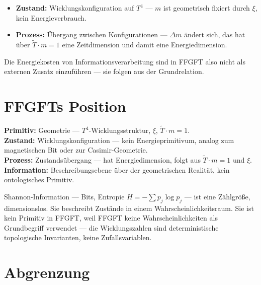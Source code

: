 \begin{itemize}
  \item \textbf{Zustand:} Wicklungskonfiguration auf $T^4$ — $m$ ist
        geometrisch fixiert durch $\xi$, kein Energieverbrauch.
  \item \textbf{Prozess:} Übergang zwischen Konfigurationen — $\Delta m$
        ändert sich, das hat über $\tilde{T} \cdot m = 1$ eine
        Zeitdimension und damit eine Energiedimension.
\end{itemize}

Die Energiekosten von Informationsverarbeitung sind in FFGFT also nicht
als externen Zusatz einzuführen — sie folgen aus der Grundrelation.

\section{FFGFTs Position}

\begin{keyresult}
\textbf{Primitiv:} Geometrie — $T^4$-Wicklungsstruktur, $\xi$, $\tilde{T}\cdot m=1$.\\
\textbf{Zustand:} Wicklungskonfiguration — kein Energieprimitivum, analog
zum magnetischen Bit oder zur Casimir-Geometrie.\\
\textbf{Prozess:} Zustandsübergang — hat Energiedimension, folgt aus
$\tilde{T}\cdot m=1$ und $\xi$.\\
\textbf{Information:} Beschreibungsebene über der geometrischen Realität,
kein ontologisches Primitiv.
\end{keyresult}

Shannon-Information \cite{Shannon1948} — Bits, Entropie $H = -\sum p_j \log p_j$
— ist eine Zählgröße, dimensionslos. Sie beschreibt Zustände in einem
Wahrscheinlichkeitsraum. Sie ist kein Primitiv in FFGFT, weil FFGFT
keine Wahrscheinlichkeiten als Grundbegriff verwendet — die Wicklungszahlen
sind deterministische topologische Invarianten, keine Zufallsvariablen.

\section{Abgrenzung}

